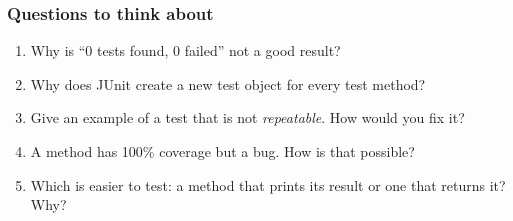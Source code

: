 \documentclass[aspectratio=169,10pt,compress]{beamer}
\begin{document}
\begin{frame}[t,fragile] \frametitle{Questions to think about}
  \begin{enumerate}\small
    \item Why is ``0 tests found, 0 failed'' not a good result?
    \item Why does JUnit create a new test object for every test method?
    \item Give an example of a test that is not \emph{repeatable}. How would you fix it?
    \item A method has 100\% coverage but a bug. How is that possible?
    \item Which is easier to test: a method that prints its result or one that returns it? Why?
  \end{enumerate}
\end{frame}




\begin{frame}[t,fragile]
	\begin{center}
		\vspace{4cm}
	\end{center}
\end{frame}
\end{document}
